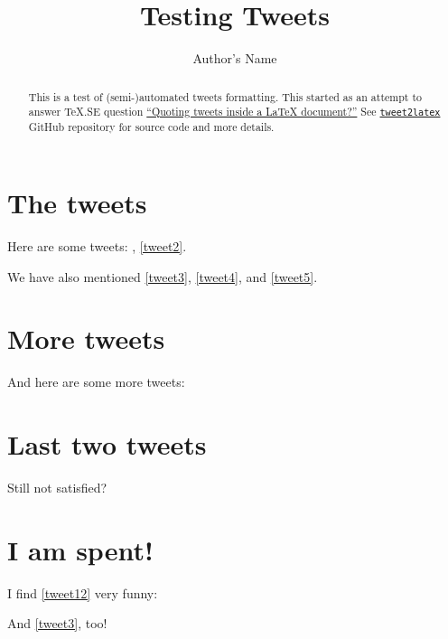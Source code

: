 \documentclass[a4paper,twocolumn]{article}
\newcommand{\inputTweet}[1]{%
  \def\tweetLabel{#1}%
}
\begin{document}
\title{Testing Tweets}
\author{Author's Name}

\maketitle

\begin{abstract}
  This is a test of (semi-)automated tweets formatting. This started as an
  attempt to answer \TeX .SE question
  \href{http://tex.stackexchange.com/q/323562/28495}{``Quoting tweets inside
    a \LaTeX{} document?''} See
  \texttt{\href{https://github.com/wilx/tweet2latex}{tweet2latex}} GitHub
  repository for source code and more details.
\end{abstract}

\section{The tweets}\label{the-tweets}%
Here are some tweets: , \cref{tweet2}.
\inputTweet{tweet1}

\inputTweet{tweet2}

\inputTweet{tweet3}

\inputTweet{tweet4}

\inputTweet{tweet5}

We have also mentioned \cref{tweet3}, \cref{tweet4}, and \cref{tweet5}.

\section{More tweets}\label{more-tweets}%
And here are some more tweets:
\inputTweet{tweet6}

\inputTweet{tweet7}

\inputTweet{tweet8}

\inputTweet{tweet9}

\section{Last two tweets}\label{last-two-tweets}%
Still not satisfied?
\inputTweet{tweet10}

\inputTweet{tweet11}

\section{I am spent!}\label{i-am-spent}%
I find \cref{tweet12} very funny:
\inputTweet{tweet12}

And \cref{tweet3}, too!

\inputTweet{tweet13}

%
\end{document}
